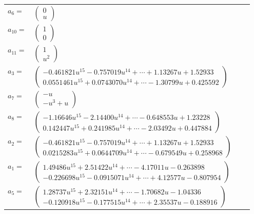 \documentclass[1p]{elsarticle_modified}
\theoremstyle{definition}
\begin{document}
\begin{tabular}{m{7pt} m{180pt} m{7pt} m{180pt} }
\flushright $a_{6}=$&$\begin{pmatrix}0\\u\end{pmatrix}$ \\
\flushright $a_{10}=$&$\begin{pmatrix}1\\0\end{pmatrix}$ \\
\flushright $a_{11}=$&$\begin{pmatrix}1\\u^2\end{pmatrix}$ \\
\flushright $a_{3}=$&$\begin{pmatrix}-0.461821 u^{15}-0.757019 u^{14}+\cdots+1.13267 u+1.52933\\0.0551461 u^{15}+0.0743070 u^{14}+\cdots-1.30799 u+0.425592\end{pmatrix}$ \\
\flushright $a_{7}=$&$\begin{pmatrix}- u\\- u^3+u\end{pmatrix}$ \\
\flushright $a_{8}=$&$\begin{pmatrix}-1.16646 u^{15}-2.14400 u^{14}+\cdots-0.648553 u+1.23228\\0.142447 u^{15}+0.241985 u^{14}+\cdots-2.03492 u+0.447884\end{pmatrix}$ \\
\flushright $a_{2}=$&$\begin{pmatrix}-0.461821 u^{15}-0.757019 u^{14}+\cdots+1.13267 u+1.52933\\0.0215283 u^{15}+0.0644709 u^{14}+\cdots-0.679549 u+0.258968\end{pmatrix}$ \\
\flushright $a_{1}=$&$\begin{pmatrix}1.49486 u^{15}+2.51422 u^{14}+\cdots-4.17011 u-0.263898\\-0.226698 u^{15}-0.0915071 u^{14}+\cdots+4.12577 u-0.807954\end{pmatrix}$ \\
\flushright $a_{5}=$&$\begin{pmatrix}1.28737 u^{15}+2.32151 u^{14}+\cdots-1.70682 u-1.04336\\-0.120918 u^{15}-0.177515 u^{14}+\cdots+2.35537 u-0.188916\end{pmatrix}$ \\

\end{tabular}
\end{document}
